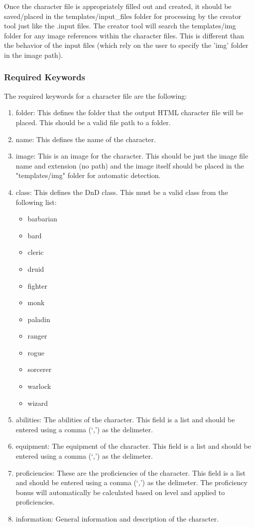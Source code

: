 Once the character file is appropriately filled out and created, it should be saved/placed in the templates/input\_files folder for processing by the creator tool just like the .input files. The creator tool will search the templates/img folder for any image references within the character files. This is different than the behavior of the input files (which rely on the user to specify the 'img' folder in the image path).






\subsubsection{Required Keywords}

The required keywords for a character file are the following:
\begin{enumerate}
	\item folder: This defines the folder that the output HTML character file will be placed. This should be a valid file path to a folder.
	\item name: This defines the name of the character.
	\item image: This is an image for the character. This should be just the image file name and extension (no path) and the image itself should be placed in the "templates/img" folder for automatic detection.
	\item class: This defines the DnD class. This must be a valid class from the following list:
		\begin{multicols}{3}
		    \begin{itemize}
		        \item barbarian
		        \item bard
		        \item cleric
		        \item druid
		        \item fighter
		        \item monk
		        \item paladin
		        \item ranger
		        \item rogue
		        \item sorcerer
		        \item warlock
		        \item wizard
		    \end{itemize}
		\end{multicols}
	\item abilities: The abilities of the character. This field is a list and should be entered using a comma (`,') as the delimeter.
	\item equipment: The equipment of the character. This field is a list and should be entered using a comma (`,') as the delimeter.
	\item proficiencies: These are the proficiencies of the character. This field is a list and should be entered using a comma (`,') as the delimeter. The proficiency bonus will automatically be calculated based on level and applied to proficiencies.
	\item information: General information and description of the character.
\end{enumerate}

